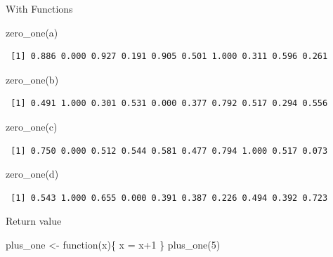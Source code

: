 \documentclass[
  ignorenonframetext,
]{beamer}
\newenvironment{Shaded}{\begin{snugshade}}{\end{snugshade}}
\newcommand{\ControlFlowTok}[1]{\textcolor[rgb]{0.00,0.23,0.31}{#1}}
\newcommand{\DecValTok}[1]{\textcolor[rgb]{0.68,0.00,0.00}{#1}}
\newcommand{\FunctionTok}[1]{\textcolor[rgb]{0.28,0.35,0.67}{#1}}
\newcommand{\NormalTok}[1]{\textcolor[rgb]{0.00,0.23,0.31}{#1}}
\newcommand{\OtherTok}[1]{\textcolor[rgb]{0.00,0.23,0.31}{#1}}
\newcommand{\SpecialCharTok}[1]{\textcolor[rgb]{0.37,0.37,0.37}{#1}}
\begin{document}
\begin{frame}[fragile]
\begin{block}{With Functions}
\protect\hypertarget{with-functions}{}
\begin{Shaded}
\begin{Highlighting}[]
\FunctionTok{zero\_one}\NormalTok{(a)}
\end{Highlighting}
\end{Shaded}

\begin{verbatim}
 [1] 0.886 0.000 0.927 0.191 0.905 0.501 1.000 0.311 0.596 0.261
\end{verbatim}

\begin{Shaded}
\begin{Highlighting}[]
\FunctionTok{zero\_one}\NormalTok{(b)}
\end{Highlighting}
\end{Shaded}

\begin{verbatim}
 [1] 0.491 1.000 0.301 0.531 0.000 0.377 0.792 0.517 0.294 0.556
\end{verbatim}

\begin{Shaded}
\begin{Highlighting}[]
\FunctionTok{zero\_one}\NormalTok{(c)}
\end{Highlighting}
\end{Shaded}

\begin{verbatim}
 [1] 0.750 0.000 0.512 0.544 0.581 0.477 0.794 1.000 0.517 0.073
\end{verbatim}

\begin{Shaded}
\begin{Highlighting}[]
\FunctionTok{zero\_one}\NormalTok{(d)}
\end{Highlighting}
\end{Shaded}

\begin{verbatim}
 [1] 0.543 1.000 0.655 0.000 0.391 0.387 0.226 0.494 0.392 0.723
\end{verbatim}
\end{block}

\begin{block}{Return value}
\protect\hypertarget{return-value}{}
\begin{Shaded}
\begin{Highlighting}[]
\NormalTok{plus\_one }\OtherTok{\textless{}{-}} \ControlFlowTok{function}\NormalTok{(x)\{}
\NormalTok{  x }\OtherTok{=}\NormalTok{ x}\SpecialCharTok{+}\DecValTok{1}
\NormalTok{\}}
\FunctionTok{plus\_one}\NormalTok{(}\DecValTok{5}\NormalTok{)}
\end{Highlighting}
\end{Shaded}
\end{block}
\end{frame}
\end{document}
